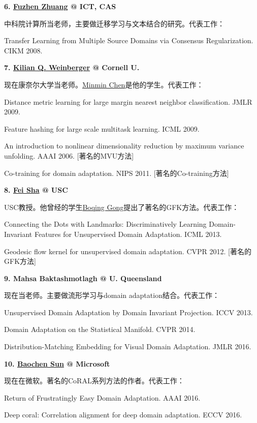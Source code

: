\textbf{6. \href{http://www.intsci.ac.cn/users/zhuangfuzhen/}{Fuzhen Zhuang} @ ICT, CAS}

中科院计算所当老师，主要做迁移学习与文本结合的研究。代表工作：

Transfer Learning from Multiple Source Domains via Consensus Regularization. CIKM 2008.


\textbf{7. \href{https://www.cs.cornell.edu/~kilian/}{Kilian Q. Weinberger} @ Cornell U.}

现在康奈尔大学当老师。\href{http://www.cse.wustl.edu/~mchen/}{Minmin Chen}是他的学生。代表工作：

Distance metric learning for large margin nearest neighbor classification. JMLR 2009.

Feature hashing for large scale multitask learning. ICML 2009.

An introduction to nonlinear dimensionality reduction by maximum variance unfolding. AAAI 2006. [著名的MVU方法]

Co-training for domain adaptation. NIPS 2011. [著名的Co-training方法]

\textbf{8. \href{http://www.cse.wustl.edu/~mchen/}{Fei Sha} @ USC}

USC教授。他曾经的学生\href{http://www.cecs.ucf.edu/faculty/boqing-gong/}{Boqing Gong}提出了著名的GFK方法。代表工作：

Connecting the Dots with Landmarks: Discriminatively Learning Domain-Invariant Features for Unsupervised Domain Adaptation. ICML 2013.

Geodesic flow kernel for unsupervised domain adaptation. CVPR 2012. [著名的GFK方法]


\textbf{9. Mahsa Baktashmotlagh @ U. Queensland}

现在当老师。主要做流形学习与domain adaptation结合。代表工作：

Unsupervised Domain Adaptation by Domain Invariant Projection. ICCV 2013.

Domain Adaptation on the Statistical Manifold. CVPR 2014.

Distribution-Matching Embedding for Visual Domain Adaptation. JMLR 2016.


\textbf{10. \href{https://www.microsoft.com/en-us/research/people/baochens/}{Baochen Sun} @ Microsoft}

现在在微软。著名的CoRAL系列方法的作者。代表工作：

Return of Frustratingly Easy Domain Adaptation. AAAI 2016.

Deep coral: Correlation alignment for deep domain adaptation. ECCV 2016.


